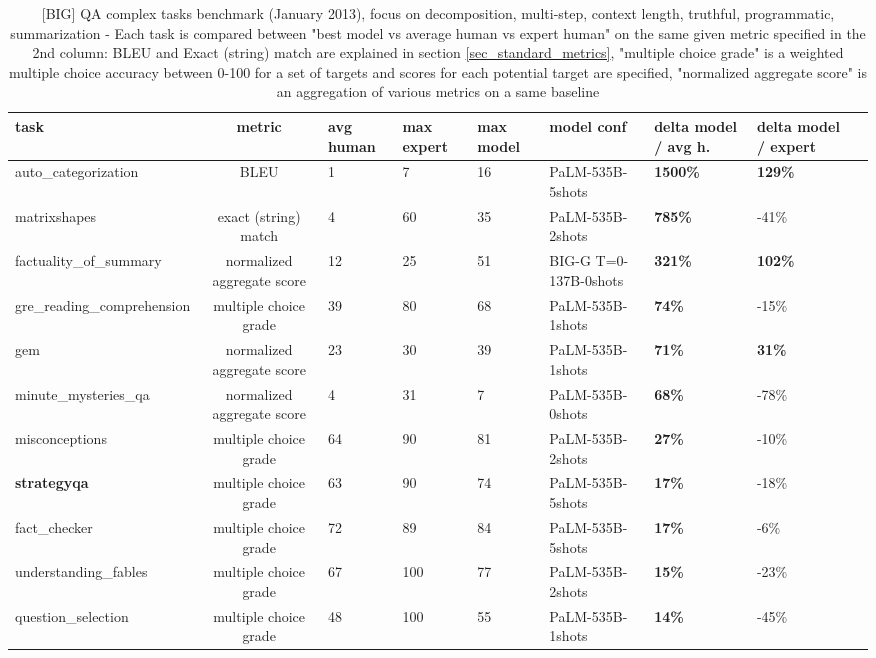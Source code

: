 \documentclass[acmsmall]{acmart}
\begin{document}
\begin{table}[!htp]\centering
{} %
\captionsetup{skip=2pt} %
\caption{[BIG] QA complex tasks benchmark (January 2013), focus on decomposition, multi-step, context length, truthful, programmatic, summarization - \tiny{Each task is compared between "best model vs average human vs expert human" on the same given metric specified in the 2nd column: BLEU and Exact (string) match are explained in section \ref{sec_standard_metrics}, "multiple choice grade" is a weighted multiple choice accuracy between 0-100 for a set of targets and scores for each potential target are specified, "normalized aggregate score" is an aggregation of various metrics on a same baseline}}\label{Table [BIG] QA complex QA}
\scriptsize
\begin{tabular}{l T V{1cm}V{1cm}V{1cm}MV{1cm}V{1cm}V{1cm}}
\toprule
task & metric & avg human & max expert & max model & model conf & delta model / avg h. & delta model / expert \\\midrule
auto\_categorization &BLEU &1 &7 &16 &PaLM-535B-5shots & \textbf{1500\%} & \textbf{129\%} \\
matrixshapes &exact (string) match &4 &60 &35 &PaLM-535B-2shots & \textbf{785\%} &-41\% \\
factuality\_of\_summary &normalized aggregate score &12 &25 &51 &BIG-G T=0-137B-0shots & \textbf{321\%} & \textbf{102\%} \\
gre\_reading\_comprehension &multiple choice grade &39 &80 &68 &PaLM-535B-1shots & \textbf{74\%} &-15\% \\
gem &normalized aggregate score &23 &30 &39 &PaLM-535B-1shots & \textbf{71\%} & \textbf{31\%} \\
minute\_mysteries\_qa &normalized aggregate score &4 &31 &7 &PaLM-535B-0shots & \textbf{68\%} &-78\% \\
misconceptions &multiple choice grade &64 &90 &81 &PaLM-535B-2shots & \textbf{27\%} &-10\% \\
\textbf{strategyqa} &multiple choice grade &63 &90 &74 &PaLM-535B-5shots & \textbf{17\%} &-18\% \\
fact\_checker &multiple choice grade &72 &89 &84 &PaLM-535B-5shots & \textbf{17\%} &-6\% \\
understanding\_fables &multiple choice grade &67 &100 &77 &PaLM-535B-2shots & \textbf{15\%} &-23\% \\
question\_selection &multiple choice grade &48 &100 &55 &PaLM-535B-1shots & \textbf{14\%} &-45\% \\

\end{tabular}
\end{table}
\end{document}
